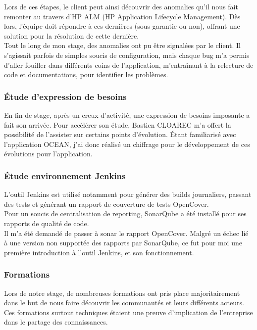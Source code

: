 \documentclass{rapport}
\begin{document}
Lors de ces étapes, le client peut ainsi découvrir des anomalies qu'il nous fait remonter au travers d'HP ALM (HP Application Lifecycle Management). Dès lors, l'équipe doit répondre à ces dernières (sous garantie ou non), offrant une solution pour la résolution de cette dernière.\\

Tout le long de mon stage, des anomalies ont pu être signalées par le client. Il s'agissait parfois de simples soucis de configuration, mais chaque bug m'a permis d'aller fouiller dans différents coins de l'application, m'entraînant à la relecture de code et documentations, pour identifier les problèmes.

\subsubsection{Étude d'expression de besoins}

En fin de stage, après un creux d'activité, une expression de besoins imposante a fait son arrivée. Pour accélérer son étude, Bastien CLOAREC m'a offert la possibilité de l'assister sur certains points d'évolution. Étant familiarisé avec l'application OCEAN, j'ai donc réalisé un chiffrage pour le développement de ces évolutions pour l'application.

\subsubsection{Étude environnement Jenkins}

L'outil Jenkins est utilisé notamment pour générer des builds journaliers, passant des tests et générant un rapport de couverture de tests OpenCover.\\
Pour un soucis de centralisation de reporting, SonarQube a été installé pour ses rapports de qualité de code.\\
Il m'a été demandé de passer à sonar le rapport OpenCover. Malgré un échec lié à une version non supportée des rapports par SonarQube, ce fut pour moi une première introduction à l'outil Jenkins, et son fonctionnement.

\subsubsection{Formations}

Lors de notre stage, de nombreuses formations ont pris place majoritairement dans le but de nous faire découvrir les communautés et leurs différents acteurs. Ces formations surtout techniques étaient une preuve d'implication de l'entreprise dans le partage des connaissances.\\
\end{document}
